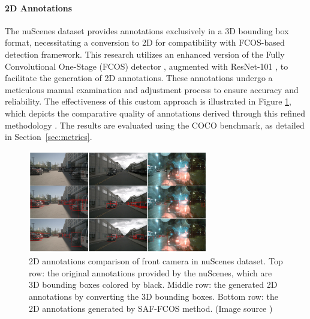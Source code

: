 \documentclass[report.tex]{subfiles}
\begin{document}
    \paragraph{2D Annotations}

    The nuScenes dataset provides annotations exclusively in a 3D bounding box format, necessitating a conversion to 2D for compatibility with FCOS-based detection framework. This research utilizes an enhanced version of the Fully Convolutional One-Stage (FCOS) detector \cite{tian2019fcos}, augmented with ResNet-101 \cite{he2016deep}, to facilitate the generation of 2D annotations. These annotations undergo a meticulous manual examination and adjustment process to ensure accuracy and reliability. The effectiveness of this custom approach is illustrated in Figure \ref{fig:saffcos_annotations}, which depicts the comparative quality of annotations derived through this refined methodology \cite{chang2020spatial}. The results are evaluated using the COCO benchmark, as detailed in Section~\ref{sec:metrics}.

    \begin{figure}[h]
        \centering
        \includegraphics[width=0.7\textwidth]{images/methods/saf_fcos/annotations of front camera in nuScenes dataset.png}
        \caption{2D annotations comparison of front camera in nuScenes dataset. Top row: the original annotations provided by the nuScenes, which are 3D bounding boxes colored by black. Middle row: the generated 2D annotations by converting the 3D bounding boxes. Bottom row: the 2D annotations generated by SAF-FCOS method. (Image source \cite{chang2020spatial})}
        \label{fig:saffcos_annotations}
    \end{figure}

\end{document}
